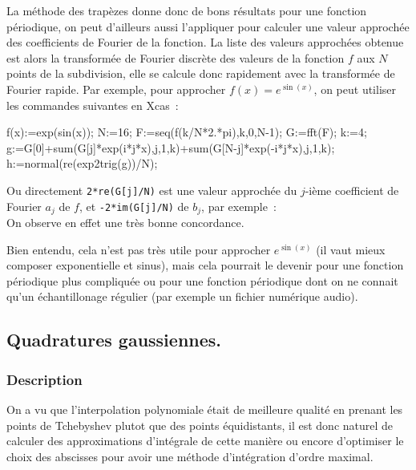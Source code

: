 \documentclass[a4paper,11pt]{article}
\begin{document}
\begin{giacjshere}
La m\'ethode des trap\`ezes donne donc de bons r\'esultats pour une 
fonction p\'eriodique, on peut d'ailleurs aussi 
l'appliquer pour calculer une valeur
approch\'ee des coefficients de Fourier de la fonction. La liste des valeurs
approch\'ees obtenue est alors la transform\'ee de Fourier discr\`ete
des valeurs de la fonction $f$ aux $N$ points de la subdivision, elle
se calcule donc rapidement avec la transform\'ee de Fourier rapide.
Par exemple, pour approcher $f(x)=e^{\sin(x)}$, on peut utiliser les
commandes suivantes en Xcas~:
\begin{giacprog}
f(x):=exp(sin(x));
N:=16; F:=seq(f(k/N*2.*pi),k,0,N-1); G:=fft(F);
k:=4;
g:=G[0]+sum(G[j]*exp(i*j*x),j,1,k)+sum(G[N-j]*exp(-i*j*x),j,1,k);
h:=normal(re(exp2trig(g))/N);
\end{giacprog}

Ou directement \verb|2*re(G[j]/N)| est une valeur approch\'ee du
$j$-i\`eme coefficient de Fourier $a_j$ de $f$, et \verb|-2*im(G[j]/N)|
de $b_j$, par exemple~:\\
On observe en effet une tr\`es bonne concordance.

Bien entendu, cela n'est pas tr\`es utile pour approcher $e^{\sin(x)}$
(il vaut mieux composer exponentielle et sinus), 
mais cela pourrait le devenir pour une
fonction p\'eriodique plus compliqu\'ee ou pour une fonction
p\'eriodique dont on ne connait qu'un \'echantillonage r\'egulier
(par exemple un fichier num\'erique audio).

\subsection{Quadratures gaussiennes.}
\subsubsection{Description}
On a vu que l'interpolation polynomiale \'etait de meilleure
qualit\'e en prenant les points de Tchebyshev plutot que
des points \'equidistants, il est donc naturel de calculer
des approximations d'int\'egrale de cette mani\`ere
ou encore d'optimiser le choix des abscisses pour avoir
une m\'ethode d'int\'egration d'ordre maximal.


\end{giacjshere}
\end{document}
